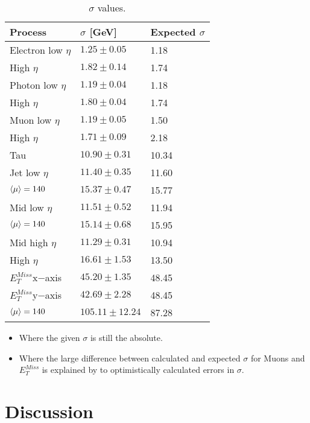 \begin{table}[H]
\begin{center}
\begin{tabular}{|l|l|l|}
\hline
Process&$\sigma$ [GeV]&Expected $\sigma$\\ \hline
Electron low $\eta$&$1.25 \pm 0.05$&1.18\\
High $\eta$&$1.82 \pm 0.14$&1.74\\ \hline
Photon low $\eta$&$1.19 \pm 0.04$&1.18\\
High $\eta$&$1.80 \pm 0.04$&1.74\\ \hline
Muon low $\eta$&$1.19 \pm 0.05$&1.50\\
High $\eta$&$1.71 \pm 0.09$&2.18\\ \hline
Tau&$10.90 \pm 0.31$&10.34\\ \hline
Jet low $\eta$&$11.40 \pm 0.35$&11.60\\
$\left<\mu\right>=140$&$15.37 \pm 0.47$&15.77\\
Mid low $\eta$&$11.51 \pm 0.52$&11.94\\
$\left<\mu\right>=140$&$15.14 \pm 0.68$&15.95\\
Mid high $\eta$&$11.29 \pm 0.31$&10.94\\
High $\eta$&$16.61 \pm 1.53$&13.50\\ \hline
$E_T^{Miss} $x$-$axis&$45.20 \pm 1.35$&48.45\\ \hline
$E_T^{Miss} $y$-$axis&$42.69 \pm 2.28$&48.45\\ 
$\left<\mu\right>=140$&$105.11 \pm 12.24$&87.28\\  \hline
\end{tabular}
\end{center}
\caption{$\sigma$ values.}
\label{tab:sigmaval}
\end{table}
\begin{itemize}
\item Where the given $\sigma$ is still the absolute. 
\item Where the large difference between calculated and expected $\sigma$ for Muons and $E_T^{Miss}$ is explained by to optimistically calculated errors in $\sigma$.
\end{itemize}
\newpage
\section{Discussion}
